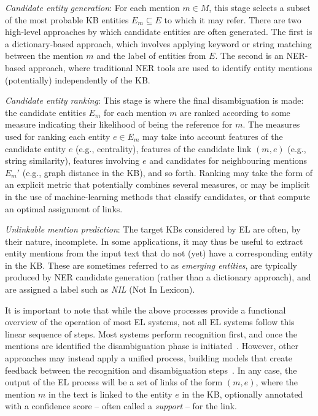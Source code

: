 \documentclass{llncs}
\begin{document}
\begin{description}
\item \textit{Candidate entity generation}:
For each mention $m\in{}M$, this stage selects a subset of the most probable KB entities $E_m \subseteq E$ to which it may refer. There are two high-level approaches by which candidate entities are often generated. The first is a dictionary-based approach, which involves applying keyword or string matching between the mention $m$ and the label of entities from $E$. The second is an NER-based approach, where traditional NER tools are used to identify entity mentions (potentially) independently of the KB. 

\item \textit{Candidate entity ranking}: This stage is where the final disambiguation is made: the candidate entities $E_m$ for each mention $m$ are ranked according to some measure indicating their likelihood of being the reference for $m$. The measures used for ranking each entity $e \in E_m$ may take into account features of the candidate entity $e$ (e.g., centrality), features of the candidate link $(m,e)$ (e.g., string similarity), features involving $e$ and candidates for neighbouring mentions $E_m'$ (e.g., graph distance in the KB), and so forth. Ranking may take the form of an explicit metric that potentially combines several measures, or may be implicit in the use of machine-learning methods that classify candidates, or that compute an optimal assignment of links.

\item \textit{Unlinkable mention prediction}: The target KBs considered by EL are often, by their nature, incomplete. In some applications, it may thus be useful to extract entity mentions from the input text that do not (yet) have a corresponding entity in the KB. These are sometimes referred to as \textit{emerging entities}, are typically produced by NER candidate generation (rather than a dictionary approach), and are assigned a label such as \textit{NIL} (Not In Lexicon). 
\end{description}

It is important to note that while the above processes provide a functional overview of the operation of most EL systems, not all EL systems follow this linear sequence of steps. Most systems perform recognition first, and once the mentions are identified the disambiguation phase is initiated~\cite{mendes2011dbpedia,Babelfy-moro2014entity}. However, other approaches may instead apply a unified process, building models that create feedback between the recognition and disambiguation steps~\cite{fahrni2012hits}. In any case, the output of the EL process will be a set of links of the form $(m,e)$, where the mention $m$ in the text is linked to the entity $e$ in the KB, optionally annotated with a confidence score -- often called a \textit{support} --  for the link.
\end{document}

